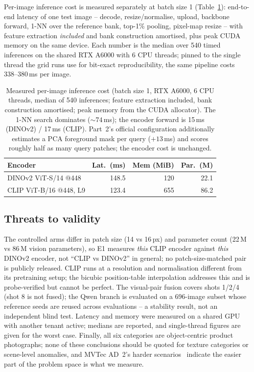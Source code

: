 Per-image inference cost is measured separately at batch size 1 (Table~\ref{tab:cost}):
end-to-end latency of one test image -- decode, resize/normalise, upload, backbone forward,
1-NN over the reference bank, top-1\% pooling, pixel-map resize -- with feature extraction
\emph{included} and bank construction amortised, plus peak CUDA memory on the same device.
Each number is the median over 540 timed inferences on the shared RTX A6000 with 6 CPU
threads; pinned to the single thread the grid runs use for bit-exact reproducibility, the
same pipeline costs 338--380\,ms per image.

\begin{table}[t]
\centering
\caption{Measured per-image inference cost (batch size 1, RTX A6000, 6 CPU threads, median
of 540 inferences; feature extraction included, bank construction amortised; peak memory
from the CUDA allocator). The 1-NN search dominates (${\sim}74$\,ms); the encoder forward
is 15\,ms (DINOv2) / 17\,ms (CLIP). Part~2's official configuration additionally estimates
a PCA foreground mask per query ($+13$\,ms) and scores roughly half as many query patches;
the encoder cost is unchanged.}
\label{tab:cost}
\footnotesize
\setlength{\tabcolsep}{3.0pt}
\begin{tabular}{lrrr}
\toprule
Encoder & Lat.\ (ms) & Mem (MiB) & Par.\ (M) \\
\midrule
DINOv2 ViT-S/14 @448 & 148.5 & 120 & 22.1 \\
CLIP ViT-B/16 @448, L9 & 123.4 & 655 & 86.2 \\
\bottomrule
\end{tabular}
\end{table}

\subsection{Threats to validity}
\label{sec:exp-threats}

The controlled arms differ in patch size (14 vs 16\,px) and parameter count (22\,M vs 86\,M
vision parameters), so E1 measures \emph{this} CLIP encoder against \emph{this} DINOv2
encoder, not ``CLIP vs DINOv2'' in general; no patch-size-matched pair is publicly released.
CLIP runs at a resolution and normalisation different from its pretraining setup; the bicubic
position-table interpolation addresses this and is probe-verified but cannot be perfect. The
visual-pair fusion covers shots 1/2/4 (shot 8 is not fused); the Qwen branch is evaluated on
a 696-image subset whose reference seeds are reused across evaluations -- a stability result,
not an independent blind test. Latency and memory were measured on a shared GPU with another
tenant active; medians are reported, and single-thread figures are given for the worst case.
Finally, all six categories are object-centric product photographs; none of these
conclusions should be quoted for texture categories or scene-level anomalies, and MVTec
AD~2's harder scenarios~\cite{hecklerkram2026mvtec2} indicate the easier part of the problem
space is what we measure.
